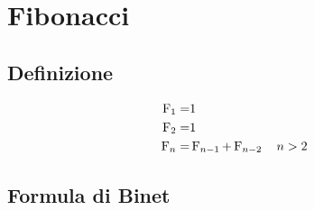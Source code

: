 \chapter{Fibonacci}
\section{Definizione}
\begin{defn}
	\begin{align*}
		\operatorname{F}_{1}=&1\\
		\operatorname{F}_{2}=&1\\
		\operatorname{F}_{n}=&\operatorname{F}_{n-1}+\operatorname{F}_{n-2}\quad n>2
	\end{align*}
\end{defn}
\section{Formula di Binet}